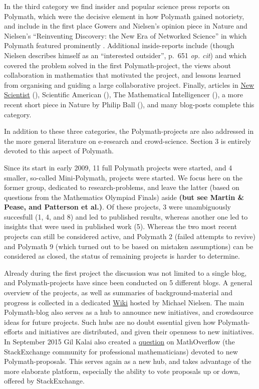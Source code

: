 \documentclass[article, floatfix, groupaddress, prb]{revtex4-1}
\begin{document}
In the third category we find insider and popular science press reports
on Polymath, which were the decisive element in how Polymath gained
notoriety, and include in the first place Gowers and Nielsen's opinion
piece in Nature \cite{Gowers:Nature:2009} and Nielsen's ``Reinventing
Discovery: the New Era of Networked Science'' in which Polymath featured
prominently \cite{Nielsen:ReinventingDiscoveryTheNewEraOf:2012}.
Additional inside-reports include \cite{Nielsen2010} (though Nielsen
describes himself as an ``interested outsider'', p.~651 \emph{op. cit})
and \cite{Gowers:AnIrregularMind:2010} which covered the problem solved
in the first Polymath-project, the views about collaboration in
mathematics that motivated the project, and lessons learned from
organising and guiding a large collaborative project. Finally, articles
in
\href{https://www.newscientist.com/article/mg21028113-900-how-to-build-the-global-mathematics-brain/}{New
Scientist} (\cite{aron2011build}), Scientific American
(\cite{castelvecchi2010problem}), The Mathematical Intelligencer
(\cite{Nathanson}), a more recent short piece in Nature by Philip Ball
(\cite{Ball2014}), and many blog-posts complete this category.

In addition to these three categories, the Polymath-projects are also
addressed in the more general literature on e-research and
crowd-science. Section 3 is entirely devoted to this aspect of Polymath.

    Since its start in early 2009, 11 full Polymath projects were started,
and 4 smaller, so-called Mini-Polymath, projects were started. We focus
here on the former group, dedicated to research-problems, and leave the
latter (based on questions from the Mathematics Olympiad Finals) aside
\textbf{(but see Martin \& Pease, and Patterson et al.)}. Of these
projects, 3 were unambiguously succesfull (1, 4, and 8) and led to
published results, whereas another one led to insights that were used in
published work (5). Whereas the two most recent projects can still be
considered active, and Polymath 2 (failed attempts to revive) and
Polymath 9 (which turned out to be based on mistaken assumptions) can be
considered as closed, the status of remaining projects is harder to
determine.

Already during the first project the discussion was not limited to a
single blog, and Polymath-projects have since been conducted on 5
different blogs. A general overview of the projects, as well as
summaries of background-material and progress is collected in a
dedicated
\href{http://www.michaelnielsen.org/polymath1/index.php?title=Main_Page}{Wiki}
hosted by Michael Nielsen. The main Polymath-blog also serves as a hub
to announce new initiatives, and crowdsource ideas for future projects.
Such hubs are no doubt essential given how Polymath-efforts and
initiatives are distributed, and given their openness to new
initiatives. In September 2015 Gil Kalai also created a
\href{http://mathoverflow.net/questions/219638/proposals-for-polymath-projects}{question}
on MathOverflow (the StackExchange community for professional
mathematicians) devoted to new Polymath-proposals. This serves again as
a new hub, and takes advantage of the more elaborate platform,
especially the ability to vote proposals up or down, offered by
StackExchange.
\end{document}

